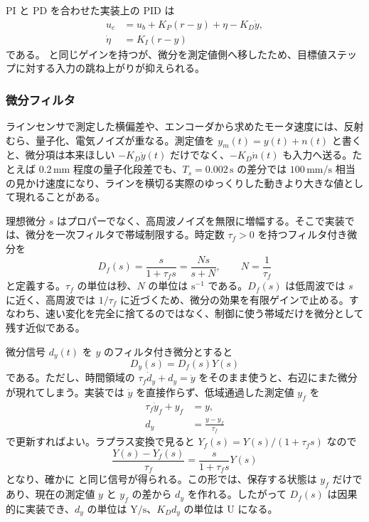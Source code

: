 PI と PD を合わせた実装上の PID は
\begin{align}
  u_c&=u_b+K_P(r-y)+\eta-K_D\dot{y},\\
  \dot{\eta}&=K_I(r-y)
\end{align}
である。 と同じゲインを持つが、微分を測定値側へ移したため、目標値ステップに対する入力の跳ね上がりが抑えられる。

\subsubsection{微分フィルタ}

ラインセンサで測定した横偏差や、エンコーダから求めたモータ速度には、反射むら、量子化、電気ノイズが重なる。測定値を $y_m(t)=y(t)+n(t)$ と書くと、微分項は本来ほしい $-K_D\dot{y}(t)$ だけでなく、$-K_D\dot{n}(t)$ も入力へ送る。たとえば $0.2\,\mathrm{mm}$ 程度の量子化段差でも、$T_s=0.002\,\mathrm{s}$ の差分では $100\,\mathrm{mm/s}$ 相当の見かけ速度になり、ラインを横切る実際のゆっくりした動きより大きな値として現れることがある。

理想微分 $s$ はプロパーでなく、高周波ノイズを無限に増幅する。そこで実装では、微分を一次フィルタで帯域制限する。時定数 $\tau_f>0$ を持つフィルタ付き微分を
\begin{equation}
  D_f(s)=\frac{s}{1+\tau_fs}
  =\frac{Ns}{s+N},
  \qquad
  N=\frac{1}{\tau_f}
  \label{eq:filtered-derivative}
\end{equation}
と定義する。$\tau_f$ の単位は秒、$N$ の単位は $\mathrm{s}^{-1}$ である。$D_f(s)$ は低周波では $s$ に近く、高周波では $1/\tau_f$ に近づくため、微分の効果を有限ゲインで止める。すなわち、速い変化を完全に捨てるのではなく、制御に使う帯域だけを微分として残す近似である。

微分信号 $d_y(t)$ を $y$ のフィルタ付き微分とすると
\begin{equation}
  D_y(s)=D_f(s)Y(s)
\end{equation}
である。ただし、時間領域の $\tau_f\dot{d}_y+d_y=\dot{y}$ をそのまま使うと、右辺にまた微分が現れてしまう。実装では $\dot{y}$ を直接作らず、低域通過した測定値 $y_f$ を
\begin{align}
  \tau_f\dot{y}_f+y_f&=y,\\
  d_y&=\frac{y-y_f}{\tau_f}
\end{align}
で更新すればよい。ラプラス変換で見ると $Y_f(s)=Y(s)/(1+\tau_fs)$ なので
\begin{equation}
  \frac{Y(s)-Y_f(s)}{\tau_f}
  =\frac{s}{1+\tau_fs}Y(s)
\end{equation}
となり、確かに  と同じ信号が得られる。この形では、保存する状態は $y_f$ だけであり、現在の測定値 $y$ と $y_f$ の差から $d_y$ を作れる。したがって $D_f(s)$ は因果的に実装でき、$d_y$ の単位は $\mathrm{Y}/\mathrm{s}$、$K_Dd_y$ の単位は $\mathrm{U}$ になる。

